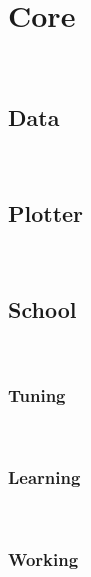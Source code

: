 
\section{Core}
~\\
\subsection{Data}
~\\
%
\begin{changemargin}{1.5cm}{1.5cm} 
  
\end{changemargin}
%

\subsection{Plotter}
~\\
%
\begin{changemargin}{1.5cm}{1.5cm} 
  
\end{changemargin}
%

\subsection{School}
~\\
\subsubsection{Tuning}
~\\
%
\begin{changemargin}{1.5cm}{1.5cm} 
  
\end{changemargin}
%

\subsubsection{Learning}
~\\
%
\begin{changemargin}{1.5cm}{1.5cm} 
  
\end{changemargin}
%

\subsubsection{Working}
~\\
%
\begin{changemargin}{1.5cm}{1.5cm} 
  
\end{changemargin}
%

